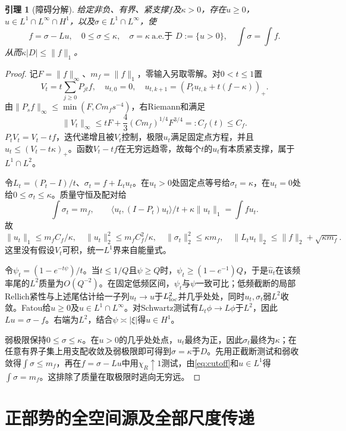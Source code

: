 \documentclass[UTF8,11pt,a4paper,fontset=fandol]{ctexart}
\newtheorem{lemma}[theorem]{引理}
\theoremstyle{remark}\newtheorem{remark}[theorem]{注}
\newcommand{\1}{\mathbf1}\newcommand{\pos}[1]{(#1)_+}
\begin{document}
\begin{lemma}[障碍分解]\label{lem:obstacle}
给定非负、有界、紧支撑$f$及$\kappa>0$，存在$u\ge0$，
$u\in L^1\cap L^\infty\cap H^1$，以及$\sigma\in L^1\cap L^\infty$，使
\begin{equation}\label{eq:obstacle}
 f=\sigma-Lu,\quad 0\le\sigma\le\kappa,\quad
 \sigma=\kappa\ \text{a.e.于 }D:=\{u>0\},\quad \int\sigma=\int f.
\end{equation}
从而$\kappa|D|\le\|f\|_1$。
\end{lemma}
\begin{proof}
记$F=\|f\|_\infty$、$m_f=\|f\|_1$，零输入另取零解。对$0<t\le1$置
\[
 V_t=t\sum_{j\ge0}P_{jt}f,
 \quad u_{t,0}=0,\quad u_{t,k+1}=\pos{P_tu_{t,k}+t(f-\kappa)}.
\]
由$\|P_sf\|_\infty\le\min(F,Cm_fs^{-4})$，右Riemann和满足
\[
 \|V_t\|_\infty\le tF+\frac43(Cm_f)^{1/4}F^{3/4}=:C_f(t)\le C_f.
\]
$P_tV_t=V_t-tf$，迭代递增且被$V_t$控制，极限$u_t$满足固定点方程，并且$u_t\le(V_t-t\kappa)_+$。函数$V_t-tf$在无穷远趋零，故每个$t$的$u_t$有本质紧支撑，属于$L^1\cap L^2$。

令$L_t=(P_t-I)/t$、$\sigma_t=f+L_tu_t$。在$u_t>0$处固定点等号给$\sigma_t=\kappa$，在$u_t=0$处给$0\le\sigma_t\le\kappa$。质量守恒及配对给
\[
 \int\sigma_t=m_f,\qquad
 \langle u_t,(I-P_t)u_t\rangle/t+\kappa\|u_t\|_1=\int f u_t.
\]
故
\[
 \|u_t\|_1\le m_f C_f/\kappa,\quad
 \|u_t\|_2^2\le m_f C_f^2/\kappa,\quad
 \|\sigma_t\|_2^2\le\kappa m_f,\quad
 \|L_tu_t\|_2\le\|f\|_2+\sqrt{\kappa m_f}.
\]
这里没有假设$V_t$可积，统一$L^1$界来自能量式。

令$\psi_t=(1-e^{-t\psi})/t$。当$t\le1/Q$且$\psi\ge Q$时，$\psi_t\ge(1-e^{-1})Q$，于是$\widehat u_t$在该频率尾的$L^2$质量为$O(Q^{-2})$。在固定低频区间，$\psi_t$与$\psi$一致可比；低频截断的局部Rellich紧性与上述尾估计给一子列$u_t\to u$于$L^2_{\rm loc}$并几乎处处，同时$u_t,\sigma_t$弱$L^2$收敛。Fatou给$u\ge0$及$u\in L^1\cap L^\infty$。对Schwartz测试有$L_t\phi\to L\phi$于$L^2$，因此$Lu=\sigma-f$。右端为$L^2$，结合$\psi\asymp|\xi|$得$u\in H^1$。

弱极限保持$0\le\sigma\le\kappa$。在$u>0$的几乎处处点，$u_t$最终为正，因此$\sigma_t$最终为$\kappa$；在任意有界子集上用支配收敛及弱极限即可得到$\sigma=\kappa$于$D$。先用正截断测试和弱收敛得$\int\sigma\le m_f$，再在$f=\sigma-Lu$中用$\chi_R\uparrow1$测试，由\eqref{eq:cutoff}和$u\in L^1$得$\int\sigma=m_f$。这排除了质量在取极限时逃向无穷远。
\end{proof}

\section{正部势的全空间源及全部尺度传递}
\end{document}
